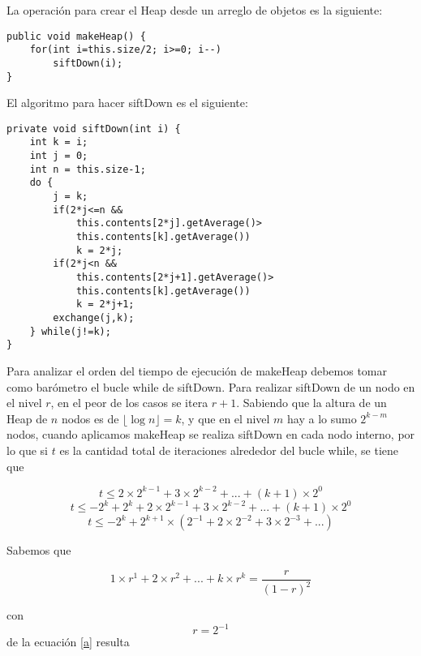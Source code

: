 \documentclass[a4paper,10pt,spanish]{article}
\begin{document}
	La operaci\'on para crear el Heap desde un arreglo de objetos es la siguiente:
	\begin{lstlisting}
public void makeHeap() {
	for(int i=this.size/2; i>=0; i--)
		siftDown(i);
}
	\end{lstlisting}
	
	El algoritmo para hacer siftDown es el siguiente:
	\begin{lstlisting}
private void siftDown(int i) {
	int k = i;
	int j = 0;
	int n = this.size-1;
	do {
		j = k;
		if(2*j<=n && 
			this.contents[2*j].getAverage()>
			this.contents[k].getAverage())
			k = 2*j;
		if(2*j<n && 
			this.contents[2*j+1].getAverage()>
			this.contents[k].getAverage())
			k = 2*j+1;
		exchange(j,k);
	} while(j!=k);
}
	\end{lstlisting}

	Para analizar el orden del tiempo de ejecuci\'on de makeHeap debemos tomar
como bar\'ometro el bucle while de siftDown. Para realizar siftDown de un nodo
en el nivel $r$, en el peor de los casos se itera $r+1$. Sabiendo que la altura
de un Heap de $n$ nodos es de $\lfloor \log n \rfloor = k$, y que en el nivel
$m$ hay a lo sumo $2^{k-m}$ nodos, cuando aplicamos makeHeap se realiza
siftDown en cada nodo interno, por lo que si $t$ es la cantidad total de
iteraciones alrededor del bucle while, se tiene que

\begin{equation}
 t \leq 2 \times 2^{k-1} + 3 \times 2^{k-2} + ... + (k+1) \times 2^0
\end{equation}
\begin{equation}
 t \leq - 2^k + 2^k + 2 \times 2^{k-1} + 3 \times 2^{k-2} + ... + (k+1) \times 2^0
\end{equation}
\begin{equation}
\label{a}
 t \le - 2^k + 2^{k+1} \times ( 2^{-1} + 2 \times 2^{-2} + 3 \times 2^{-3} + ... )
\end{equation}

Sabemos que

\begin{equation}
 1 \times r^1 + 2 \times r^2 + ... + k \times r^k = \frac{r}{(1 - r)^2}
\end{equation}

con \begin{equation}r = 2^{-1}\end{equation}
de la ecuaci\'on \ref{a} resulta
\end{document}

